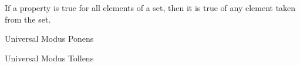 \documentclass[11pt]{article}
\begin{document}
\begin{definition}\label{def:universal-instantiation}
    If a property is true for all elements of a set, then it is true of any element taken from the set.
\end{definition}

\begin{bbox}{\centering Universal Modus Ponens}
    \begin{center}
        \begin{argument}
    \end{argument}
    \end{center}
\end{bbox}

\begin{bbox}{\centering Universal Modus Tollens}
    \begin{center}
        \begin{argument}
    \end{argument}
    \end{center}
\end{bbox}
\end{document}
